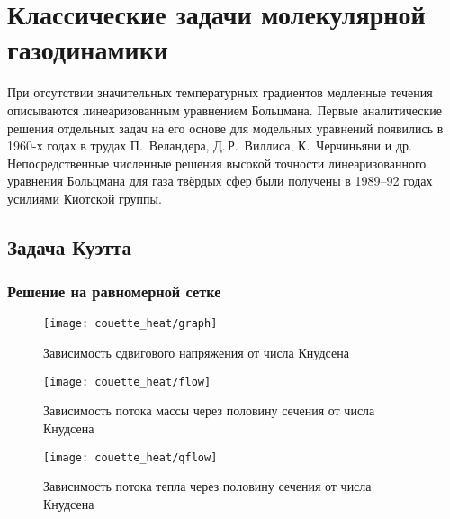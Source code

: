 \chapter{Классические задачи молекулярной газодинамики} \label{chapt:problems}

При отсутствии значительных температурных градиентов медленные течения описываются
линеаризованным уравнением Больцмана. Первые аналитические решения отдельных задач на его основе
для модельных уравнений появились в 1960-х годах в трудах П.~Веландера, Д.\,Р.~Виллиса, К.~Черчиньяни и др.
Непосредственные численные решения высокой точности линеаризованного уравнения Больцмана
для газа твёрдых сфер были получены в 1989--92 годах усилиями Киотской группы.


\section{Задача Куэтта} \label{sect:couette}

\subsection{Решение на равномерной сетке}

\begin{figure}
    \centering
    \texttt{[image: couette\_heat/graph]}
    \caption{Зависимость сдвигового напряжения от числа Кнудсена}\label{fig:couette:shear}
\end{figure}

\begin{figure}
    \centering
    \texttt{[image: couette\_heat/flow]}
    \caption{Зависимость потока массы через половину сечения от числа Кнудсена}\label{fig:couette:flow}
\end{figure}

\begin{figure}
    \centering
    \texttt{[image: couette\_heat/qflow]}
    \caption{Зависимость потока тепла через половину сечения от числа Кнудсена}\label{fig:couette:qflow}
\end{figure}

